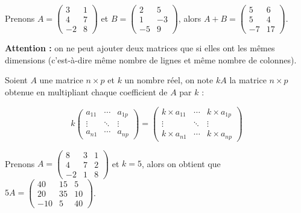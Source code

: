 \documentclass[a4paper,12pt]{book}
\begin{document}
\begin{exemple}[]
Prenons $A = \begin{pmatrix}
				3&1\\
				4&7\\
				-2&8
\end{pmatrix}$ et $B = \begin{pmatrix}
				2&5\\
				1&-3\\
				-5&9
\end{pmatrix}$, alors $A+B=\begin{pmatrix}
5&6\\5&4\\-7&17
\end{pmatrix}$.\end{exemple}
\begin{remarque}[]
\textbf{Attention :} on ne peut ajouter deux matrices que si elles ont les mêmes dimensions (c'est-à-dire même nombre de lignes et même nombre de colonnes).
\end{remarque}
\begin{definition}
Soient $A$ une matrice $n\times p$ et $k$ un nombre réel, on note $kA$ la matrice $n\times p$ obtenue en multipliant chaque coefficient de $A$ par $k$ :

$$k\begin{pmatrix}
    a_{11}      & \cdots & a_{1p} \\   
    \vdots 	& \ddots & \vdots \\ 
    a_{n1}      & \cdots & a_{np}
\end{pmatrix}=\begin{pmatrix}
    k\times a_{11}      & \cdots & k\times a_{1p} \\      
    \vdots 	& \ddots & \vdots \\ 
   k\times a_{n1}      & \cdots &k\times a_{np}
\end{pmatrix}
$$
\end{definition}

\begin{exemple}[]
Prenons $A = \begin{pmatrix}
				8&3&1\\
				4&7&2\\
				-2&1&8
\end{pmatrix}$ et $k=5$, alors on obtient que $5A = \begin{pmatrix}
				40&15&5\\
				20&35&10\\
				-10&5&40
\end{pmatrix}$.\end{exemple}
\end{document}
